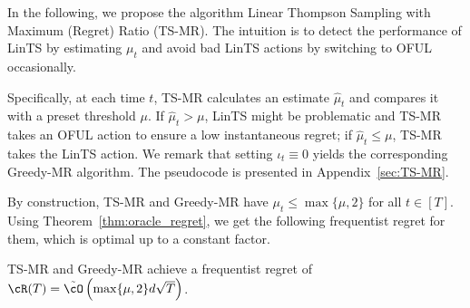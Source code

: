 In the following, we propose the algorithm Linear Thompson Sampling with Maximum (Regret) Ratio (TS-MR). The intuition is to detect the performance of LinTS by estimating $\mu_t$ and avoid bad LinTS actions by switching to OFUL occasionally. 

Specifically, at each time $t$, TS-MR calculates an estimate $\hat{\mu}_t$ and compares it with a preset threshold $\mu$. If  $\hat{\mu}_t > \mu$, LinTS might be problematic and  TS-MR takes an OFUL action to ensure a low instantaneous regret; if $\hat{\mu}_t\leq \mu$, TS-MR  takes the LinTS action. We remark that setting $\iota_t \equiv 0$ yields the corresponding Greedy-MR algorithm. The pseudocode is presented in Appendix~\ref{sec:TS-MR}.


By construction, TS-MR and Greedy-MR have $\mu_t \leq  \max\{\mu,2\}$ for all $t\in[T]$. Using Theorem~\ref{thm:oracle_regret}, we get the following frequentist regret for them, which is optimal up to a constant factor.
\begin{corollary} TS-MR and Greedy-MR achieve a frequentist regret of
$
	\cR(T) = \tilde{\cO}\left( \max\{\mu,2\} d \sqrt{T}\right)
$.
\end{corollary}









